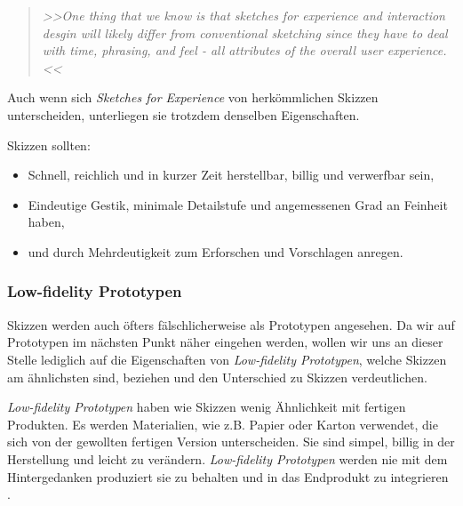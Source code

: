 \begin{quote}
	\textsl{>>One thing that we know is that sketches for experience and interaction desgin will likely differ from conventional sketching since they have to deal with time, phrasing, and feel - all attributes of the overall user experience.<<}
\begin{flushright}\citep{Buxton:2007}\end{flushright}
\end{quote}

Auch wenn sich \emph{Sketches for Experience} von herkömmlichen Skizzen unterscheiden, unterliegen sie trotzdem denselben Eigenschaften.

\medskip Skizzen sollten:
\begin{itemize}
	\item Schnell, reichlich und in kurzer Zeit herstellbar, billig und verwerfbar sein,
	\item Eindeutige Gestik, minimale Detailstufe und angemessenen Grad an Feinheit haben,
	\item und durch Mehrdeutigkeit zum Erforschen und Vorschlagen anregen.
\end{itemize}
\begin{flushright}\citep{Buxton:2007}\end{flushright}

\subsubsection{Low-fidelity Prototypen} Skizzen werden auch öfters fälschlicherweise als Prototypen angesehen. Da wir auf Prototypen im nächsten Punkt näher eingehen werden, wollen wir uns an dieser Stelle lediglich auf die Eigenschaften von \emph{Low-fidelity Prototypen}, welche Skizzen am ähnlichsten sind, beziehen und den Unterschied zu Skizzen verdeutlichen.

\medskip \emph{Low-fidelity Prototypen} haben wie Skizzen wenig Ähnlichkeit mit fertigen Produkten. Es werden Materialien, wie z.B. Papier oder Karton verwendet, die sich von der gewollten fertigen Version unterscheiden. Sie sind simpel, billig in der Herstellung und leicht zu verändern. \emph{Low-fidelity Prototypen} werden nie mit dem Hintergedanken produziert sie zu behalten und in das Endprodukt zu integrieren \citep{Sharp:2002}.

